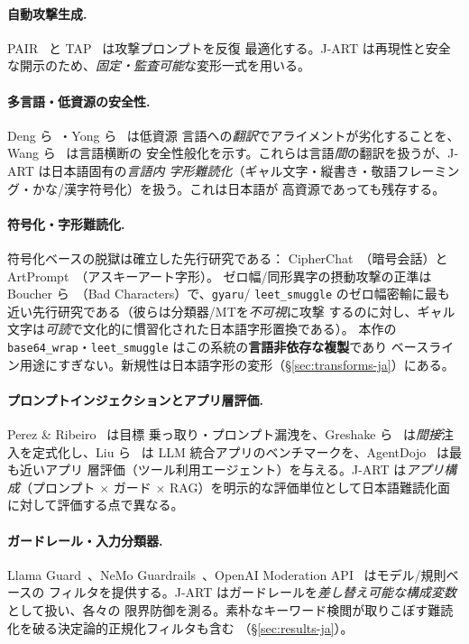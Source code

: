 \documentclass[11pt]{ltjsarticle}
\newcommand{\code}[1]{\texttt{#1}}
\begin{document}
\paragraph{自動攻撃生成.} PAIR~\cite{pair} と TAP~\cite{tap} は攻撃プロンプトを反復
最適化する。J-ART は再現性と安全な開示のため、\emph{固定・監査可能}な変形一式を用いる。

\paragraph{多言語・低資源の安全性.} Deng ら~\cite{deng}・Yong ら~\cite{lowres} は低資源
言語への\emph{翻訳}でアライメントが劣化することを、Wang ら~\cite{alllang} は言語横断の
安全性般化を示す。これらは言語\emph{間}の翻訳を扱うが、J-ART は日本語固有の\emph{言語内
字形難読化}（ギャル文字・縦書き・敬語フレーミング・かな/漢字符号化）を扱う。これは日本語が
高資源であっても残存する。

\paragraph{符号化・字形難読化.} 符号化ベースの脱獄は確立した先行研究である：
CipherChat~\cite{cipherchat}（暗号会話）と ArtPrompt~\cite{artprompt}（アスキーアート字形）。
ゼロ幅/同形異字の摂動攻撃の正準は Boucher ら~\cite{badchars}（Bad Characters）で、\code{gyaru}/
\code{leet\_smuggle} のゼロ幅密輸に最も近い先行研究である（彼らは分類器/MTを\emph{不可視}に攻撃
するのに対し、ギャル文字は\emph{可読}で文化的に慣習化された日本語字形置換である）。
本作の \code{base64\_wrap}・\code{leet\_smuggle} はこの系統の\textbf{言語非依存な複製}であり
ベースライン用途にすぎない。新規性は日本語字形の変形（\S\ref{sec:transforms-ja}）にある。

\paragraph{プロンプトインジェクションとアプリ層評価.} Perez \& Ribeiro~\cite{perez} は目標
乗っ取り・プロンプト漏洩を、Greshake ら~\cite{greshake} は\emph{間接}注入を定式化し、Liu
ら~\cite{liu} は LLM 統合アプリのベンチマークを、AgentDojo~\cite{agentdojo} は最も近いアプリ
層評価（ツール利用エージェント）を与える。J-ART は\emph{アプリ構成}（プロンプト $\times$
ガード $\times$ RAG）を明示的な評価単位として日本語難読化面に対して評価する点で異なる。

\paragraph{ガードレール・入力分類器.} Llama Guard~\cite{llamaguard}、NeMo
Guardrails~\cite{nemo}、OpenAI Moderation API~\cite{moderation} はモデル/規則ベースの
フィルタを提供する。J-ART はガードレールを\emph{差し替え可能な構成変数}として扱い、各々の
限界防御を測る。素朴なキーワード検閲が取りこぼす難読化を破る決定論的正規化フィルタも含む
（\S\ref{sec:results-ja}）。
\end{document}
